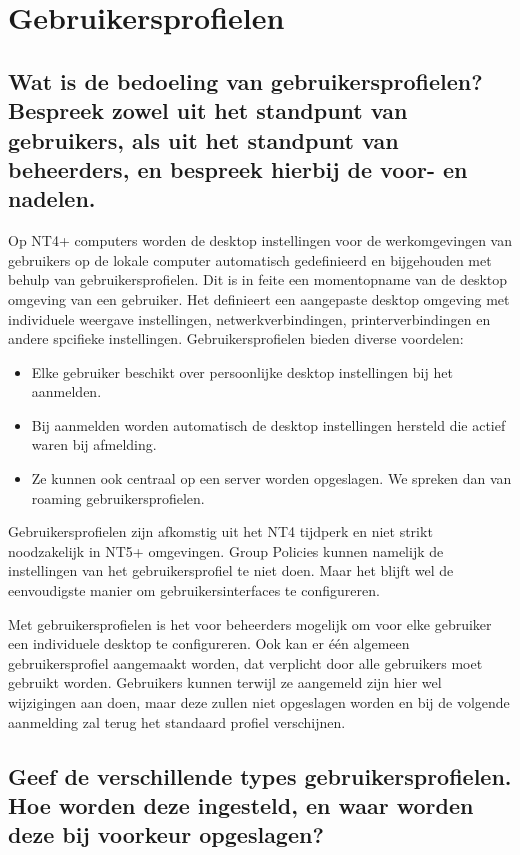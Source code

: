 \chapter{Gebruikersprofielen}

\section{Wat is de bedoeling van gebruikersprofielen? Bespreek zowel uit het
standpunt van gebruikers, als uit het standpunt van beheerders, en bespreek
hierbij de voor- en nadelen.}

Op NT4+ computers worden de desktop instellingen voor de werkomgevingen van
gebruikers op de lokale computer automatisch gedefinieerd en bijgehouden met
behulp van gebruikersprofielen. Dit is in feite een momentopname van de desktop
omgeving van een gebruiker. Het definieert een aangepaste desktop omgeving met
individuele weergave instellingen, netwerkverbindingen, printerverbindingen en
andere spcifieke instellingen. Gebruikersprofielen bieden diverse voordelen:
\begin{itemize}
	\item Elke gebruiker beschikt over persoonlijke desktop instellingen bij
		het aanmelden.
	\item Bij aanmelden worden automatisch de desktop instellingen hersteld
		die actief waren bij afmelding.
	\item Ze kunnen ook centraal op een server worden opgeslagen. We spreken
		dan van roaming gebruikersprofielen.
\end{itemize}

Gebruikersprofielen zijn afkomstig uit het NT4 tijdperk en niet strikt
noodzakelijk in NT5+ omgevingen. Group Policies kunnen namelijk de instellingen
van het gebruikersprofiel te niet doen. Maar het blijft wel de eenvoudigste
manier om gebruikersinterfaces te configureren.

Met gebruikersprofielen is het voor beheerders mogelijk om voor elke gebruiker
een individuele desktop te configureren. Ook kan er één algemeen
gebruikersprofiel aangemaakt worden, dat verplicht door alle gebruikers moet
gebruikt worden. Gebruikers kunnen terwijl ze aangemeld zijn hier wel
wijzigingen aan doen, maar deze zullen niet opgeslagen worden en bij de volgende
aanmelding zal terug het standaard profiel verschijnen.

\section{Geef de verschillende types gebruikersprofielen. Hoe worden deze
ingesteld, en waar worden deze bij voorkeur opgeslagen?}

